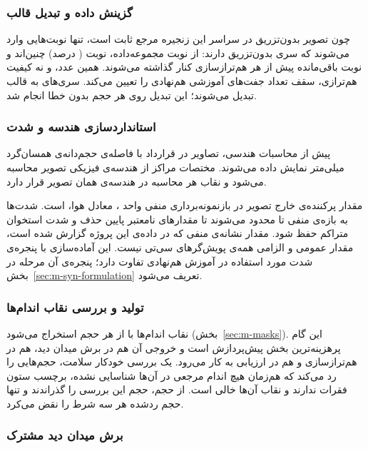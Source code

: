 \subsubsection*{گزینش داده و تبدیل قالب}

چون تصویر بدون‌تزریق در سراسر این زنجیره مرجع ثابت است، تنها نوبت‌هایی وارد می‌شوند که سری بدون‌تزریق دارند: از  نوبت مجموعه‌داده،  نوبت ( درصد) چنین‌اند و  نوبت باقی‌مانده پیش از هر هم‌ترازسازی کنار گذاشته می‌شوند. همین عدد، و نه کیفیت هم‌ترازی، سقف تعداد جفت‌های آموزشی هم‌نهادی را تعیین می‌کند. سری‌های  به قالب  تبدیل می‌شوند؛ این تبدیل روی هر  حجم بدون خطا انجام شد.

\subsubsection*{استانداردسازی هندسه و شدت}

پیش از محاسبات هندسی، تصاویر در قرارداد  با فاصله‌ی حجم‌دانه‌ی همسان‌گرد  میلی‌متر نمایش داده می‌شوند. مختصات مراکز از هندسه‌ی فیزیکی تصویر محاسبه می‌شود و نقاب هر محاسبه در هندسه‌ی همان تصویر قرار دارد.

مقدار پرکننده‌ی خارج تصویر در بازنمونه‌برداری منفی  واحد ، معادل هوا، است. شدت‌ها به بازه‌ی منفی  تا  محدود می‌شوند تا مقدارهای نامعتبر پایین حذف و شدت استخوان متراکم حفظ شود. مقدار نشانه‌ی منفی  که در داده‌ی این پروژه گزارش شده است، مقدار عمومی و الزامی همه‌ی پویش‌گرهای سی‌تی نیست. این آماده‌سازی با پنجره‌ی شدت مورد استفاده در آموزش هم‌نهادی تفاوت دارد؛ پنجره‌ی آن مرحله در بخش~\ref{sec:m-syn-formulation} تعریف می‌شود.

\subsubsection*{تولید و بررسی نقاب اندام‌ها}

نقاب اندام‌ها با  از هر حجم استخراج می‌شود (بخش~\ref{sec:m-masks}). این گام پرهزینه‌ترین بخش پیش‌پردازش است و خروجی آن هم در برش میدان دید، هم در هم‌ترازسازی و هم در ارزیابی به کار می‌رود. یک بررسی خودکار سلامت، حجم‌هایی را رد می‌کند که هم‌زمان هیچ اندام مرجعی در آن‌ها شناسایی نشده، برچسب ستون فقرات ندارند و نقاب آن‌ها خالی است. از  حجم،  حجم این بررسی را گذراندند و تنها حجم ردشده هر سه شرط را نقض می‌کرد.

\subsubsection*{برش میدان دید مشترک}

